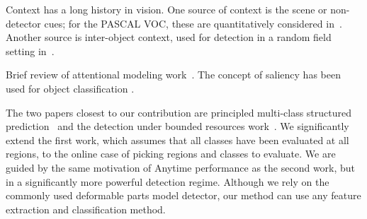 Context has a long history in vision.
One source of context is the scene or non-detector cues; for the PASCAL VOC, these are quantitatively considered in~\cite{Divvala2009}.
Another source is inter-object context, used for detection in a random field setting in~\cite{Torralba2004}.

Brief review of attentional modeling work~\cite{Itti2001a,Chikkerur2010,Judd2009}.
The concept of saliency has been used for object classification \cite{Kanan2010}.


The two papers closest to our contribution are principled multi-class structured prediction~\cite{Desai2009} and the detection under bounded resources work~\cite{Vijayanarasimhan2010}.
We significantly extend the first work, which assumes that all classes have been evaluated at all regions, to the online case of picking regions and classes to evaluate.
We are guided by the same motivation of Anytime performance as the second work, but in a significantly more powerful detection regime.
Although we rely on the commonly used deformable parts model detector, our method can use any feature extraction and classification method.